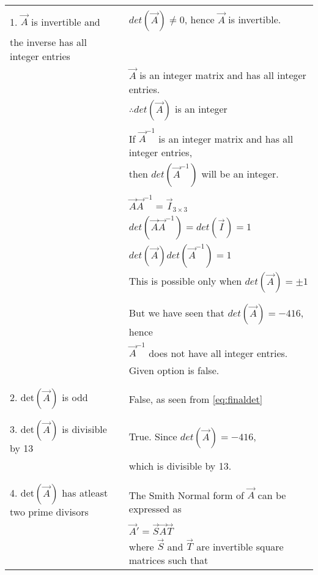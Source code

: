 \documentclass[journal,12pt]{IEEEtran}
\begin{document}
\begin{longtable}{|l|l|}
    \hline
        & \\
        1. $\vec{A}$ is invertible and & $det(\vec{A}) \neq 0$, hence $\vec{A}$ is invertible.\\
        the inverse has all integer entries & \\
        & $\vec{A}$ is an integer matrix and has all integer entries.\\
        & $\therefore det(\vec{A})$ is an integer\\
        & \\
        & If $\vec{A}^{-1}$ is an integer matrix and has all integer entries,\\ & then $det(\vec{A}^{-1})$ will be an integer.\\
        & \\
        & $\vec{A}\vec{A}^{-1} = \vec{I}_{3 \times 3}$\\
        & $det(\vec{A}\vec{A}^{-1}) = det(\vec{I}) = 1$\\
        & $det(\vec{A})det(\vec{A}^{-1}) = 1$\\
        & This is possible only when $det(\vec{A}) = \pm 1$\\
        & \\
    \hline
        & \\
        & But we have seen that $det(\vec{A}) = -416$, hence\\
        & $\vec{A}^{-1}$ does not have all integer entries.\\
        & Given option is false.\\
        & \\
    \hline
        & \\
        2. det$(\vec{A})$ is odd & False, as seen from \eqref{eq:finaldet}\\
        & \\
    \hline
        & \\
        3. det$(\vec{A})$ is divisible by 13 & True. Since $det(\vec{A}) = -416$,\\
        & which is divisible by 13.\\
        & \\
    \hline
        & \\
        4. det$(\vec{A})$ has atleast two prime divisors & The Smith Normal form of $\vec{A}$ can be expressed as\\
        & $\vec{A}' = \vec{S}\vec{A}\vec{T}$\\
        & where $\vec{S}$ and $\vec{T}$ are invertible square matrices such that\\

\end{longtable}
\end{document}
